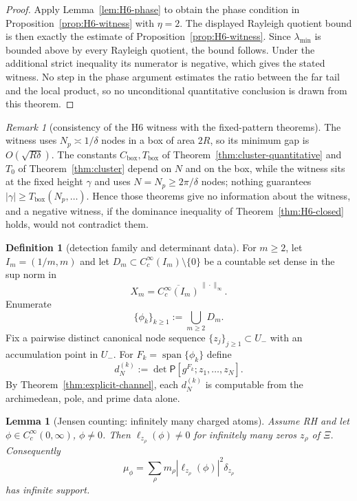 \documentclass[11pt]{amsart}
\newtheorem{lemma}[theorem]{Lemma}
\theoremstyle{definition}
\newtheorem{definition}[theorem]{Definition}
\theoremstyle{remark}
\newtheorem{remark}[theorem]{Remark}
\theoremstyle{definition}
\begin{document}
\begin{proof}
Apply Lemma~\ref{lem:H6-phase} to obtain the phase condition in Proposition~\ref{prop:H6-witness} with
$\eta=2$.  The displayed Rayleigh quotient bound is then exactly the estimate of
Proposition~\ref{prop:H6-witness}.  Since $\lambda_{\min}$ is bounded above by every Rayleigh
quotient, the bound follows.  Under the additional strict inequality its numerator is negative, which
gives the stated witness.  No step in the phase argument estimates the ratio between the far tail and
the local product, so no unconditional quantitative conclusion is drawn from this theorem.
\end{proof}

\begin{remark}[consistency of the H6 witness with the fixed-pattern theorems]\label{rmk:H6-szego-consistency}
The witness uses $N_p\asymp1/\delta$ nodes in a box of area $2R$, so its minimum gap is
$O(\sqrt{R\delta})$.  The constants $C_{\mathrm{box}},T_{\mathrm{box}}$ of
Theorem~\ref{thm:cluster-quantitative} and $T_0$ of Theorem~\ref{thm:cluster} depend on $N$ and on the
box, while the witness sits at the fixed height $\gamma$ and uses $N=N_p\ge2\pi/\delta$ nodes; nothing
guarantees $|\gamma|\ge T_{\mathrm{box}}(N_p,\ldots)$.  Hence those theorems give no information about
the witness, and a negative witness, if the dominance inequality of Theorem~\ref{thm:H6-closed} holds,
would not contradict them.
\end{remark}

\begin{definition}[detection family and determinant data]\label{def:detection-family}
For $m\ge2$, let $I_m=(1/m,m)$ and let
$D_m\subset C_c^\infty(I_m)\setminus\{0\}$ be a countable set dense in the sup norm in
\[
   X_m=\overline{C_c^\infty(I_m)}^{\,\|\cdot\|_\infty}.
\]
Enumerate
\[
   \{\phi_k\}_{k\ge1}:=\bigcup_{m\ge2}D_m.
\]
Fix a pairwise distinct canonical node sequence $\{z_j\}_{j\ge1}\subset U_-$ with an accumulation point
in $U_-$.  For $F_k=\operatorname{span}\{\phi_k\}$ define
\[
   d_N^{(k)}
   :=
   \det\mathsf P[g^{F_k};z_1,\ldots,z_N].
\]
By Theorem~\ref{thm:explicit-channel}, each $d_N^{(k)}$ is computable from the archimedean, pole, and prime
data alone.
\end{definition}

\begin{lemma}[Jensen counting: infinitely many charged atoms]\label{lem:jensen-atoms}
Assume RH and let $\phi\in C_c^\infty(0,\infty)$, $\phi\ne0$.  Then
$\ell_{z_\rho}(\phi)\ne0$ for infinitely many zeros $z_\rho$ of $\Xi$.  Consequently
\[
   \mu_\phi=\sum_\rho m_\rho|\ell_{z_\rho}(\phi)|^2\delta_{z_\rho}
\]
has infinite support.
\end{lemma}
\end{document}

